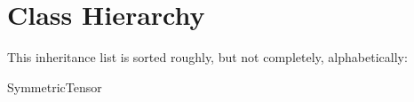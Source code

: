 \section{Class Hierarchy}
This inheritance list is sorted roughly, but not completely, alphabetically\+:\begin{DoxyCompactList}
\item Symmetric\+Tensor\begin{DoxyCompactList}
\item {}
\end{DoxyCompactList}
\end{DoxyCompactList}
